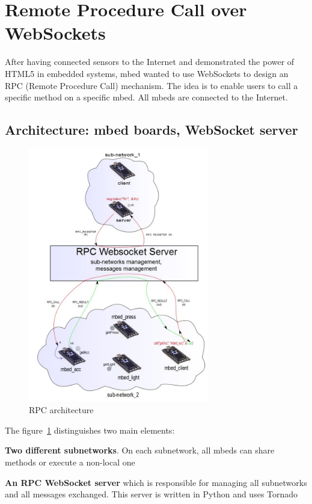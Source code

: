 \documentclass[pdftex,10pt,a4paper]{report}
\newenvironment{packed_item}{
\begin{itemize}
  \setlength{\itemsep}{1pt}
  \setlength{\parskip}{0pt}
  \setlength{\parsep}{0pt}
}{\end{itemize}}
\begin{document}
\newpage

\section{Remote Procedure Call over WebSockets}
After having connected sensors to the Internet and demonstrated the power of HTML5 in embedded systems, mbed wanted to use WebSockets to design an RPC (Remote Procedure Call) mechanism. The idea is to enable users to call a specific method on a specific mbed. All mbeds are connected to the Internet.

\subsection{Architecture: mbed boards, WebSocket server}

\begin{figure}[h!]
		\centering
		\includegraphics[width=0.7\textwidth]{./rpc-1.jpg}
		\caption{RPC architecture}
		\label{RPC architecture}
\end{figure}

The figure~\ref{RPC architecture} distinguishes two main elements:
\begin{packed_item}
	\item \textbf{Two different subnetworks}. On each subnetwork, all mbeds can share methods or execute a non-local one
	\item \textbf{An RPC WebSocket server} which is responsible for managing all subnetworks and all messages exchanged. This server is written in Python and uses Tornado
\end{packed_item}
\end{document}
